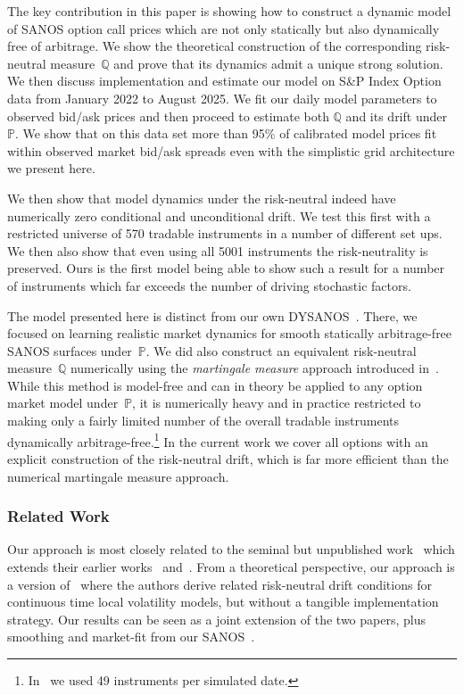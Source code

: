 \documentclass[11pt]{article}
\newcommand{\Q}{\mathbb Q}
\newcommand{\PP}{\mathbb P}
\theoremstyle{plain}
\theoremstyle{definition}
\theoremstyle{remark}
\begin{document}
The key contribution in this paper is showing how to construct a dynamic model of SANOS option call prices which are not only statically but
also dynamically free of arbitrage. We show the theoretical construction of the corresponding risk-neutral measure~$\mathbb{Q}$
and prove that its dynamics admit a unique strong solution. We then discuss implementation
and estimate our model on S\&P Index Option data from January 2022 to August 2025. We fit our daily model parameters to observed bid/ask prices and then proceed to
estimate both $\Q$ and its drift under $\PP$. We show that
on this data set more than 95\% of calibrated
model prices fit within observed market bid/ask spreads even with the simplistic grid architecture we present here.

We then show that model dynamics under the risk-neutral indeed have numerically zero conditional and unconditional drift. We test this first
with a restricted universe of 570 tradable instruments in a number of different set ups. We then also show that even using all 5001 instruments
the risk-neutrality is preserved. Ours is the first model being able to show such a result for a number of instruments which far exceeds
the number of driving stochastic factors.

The model presented here is distinct from our own DYSANOS~\cite{DYSANOS2026}. There, we focused on learning
realistic market dynamics for smooth statically arbitrage-free SANOS
surfaces under~$\PP$.
We did also construct an equivalent risk-neutral measure~$\Q$ numerically using the \emph{martingale measure} approach introduced in~\cite{removedrift}.
While this method is model-free and can in theory be applied to any option market model under~$\PP$, it is numerically heavy and in practice
restricted to making only a fairly limited number of the overall tradable instruments
dynamically arbitrage-free.\footnote{In~\cite{DYSANOS2026} we used 49 instruments per simulated date.} In the current work we cover all options with
an explicit construction of the risk-neutral drift, which is far more efficient than the numerical martingale measure approach.

\subsubsection*{Related Work}

Our approach is most closely related to the seminal but unpublished work~\cite{Wissel2007}
which extends their earlier works~\cite{SchweizerWissel2008} and~\cite{Schweizer2007}. From a
theoretical perspective, our approach is a version of~\cite{CarmonaNadtochiy2008} where
the authors derive related risk-neutral drift conditions for continuous time local volatility models, 
but without a tangible implementation strategy. Our results
can be seen as a joint extension of the two papers, plus  smoothing and market-fit from our SANOS~\cite{SANOS2026}. 
\end{document}
